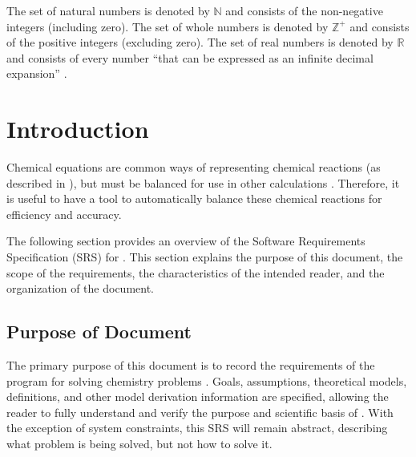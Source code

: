 \documentclass[12pt]{article}
\begin{document}
The set of natural numbers is denoted by $\mathbb{N}$ and consists of the
non-negative integers (including zero). The set of whole numbers is denoted by
$\mathbb{Z}^+$ and consists of the positive integers (excluding zero). The
set of real numbers is denoted by $\mathbb{R}$ and consists of every number
``that can be expressed as an infinite decimal expansion''
\cite{the_editors_of_encyclopaedia_britannica_real_2022}.


\newpage



\section{Introduction} \label{sec_intro}
Chemical equations are common ways of representing chemical reactions (as
described in ), but must be balanced for use in other
calculations \cite{lund_introduction_2023}. Therefore, it is useful to have a
tool to automatically balance these chemical reactions for efficiency and
accuracy.

The following section provides an overview of the Software Requirements
Specification (SRS) for \progname{}. This section explains the purpose of this
document, the scope of the requirements, the characteristics of the intended
reader, and the organization of the document.

\subsection{Purpose of Document}

The primary purpose of this document is to record the requirements of the
program for solving chemistry problems .
Goals, assumptions, theoretical models,
definitions, and other model derivation information are specified, allowing the
reader to fully understand and verify the purpose and scientific basis of
\progname{}. With the exception of system constraints, this SRS will remain
abstract, describing what problem is being solved, but not how to solve it.
\end{document}
